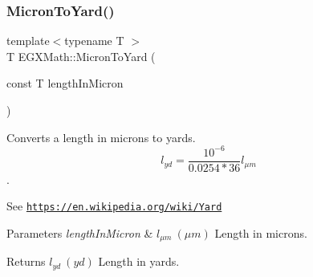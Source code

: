 \subsubsection{\texorpdfstring{Micron\+To\+Yard()}{MicronToYard()}}
{\footnotesize\ttfamily template$<$typename T $>$ \\
T E\+G\+X\+Math\+::\+Micron\+To\+Yard (\begin{DoxyParamCaption}\item[{const T}]{length\+In\+Micron }\end{DoxyParamCaption})}



Converts a length in microns to yards. \[ l_{yd}= \frac{10^{-6}}{0.0254 * 36} l_{\mu m} \]. 

See \href{https://en.wikipedia.org/wiki/Yard}{\tt https\+://en.\+wikipedia.\+org/wiki/\+Yard} 
\begin{DoxyParams}{Parameters}
{\em length\+In\+Micron} & $ l_{\mu m}\ (\mu m)$ Length in microns. \\
\hline
\end{DoxyParams}
\begin{DoxyReturn}{Returns}
$ l_{yd}\ (yd)$ Length in yards. 
\end{DoxyReturn}
